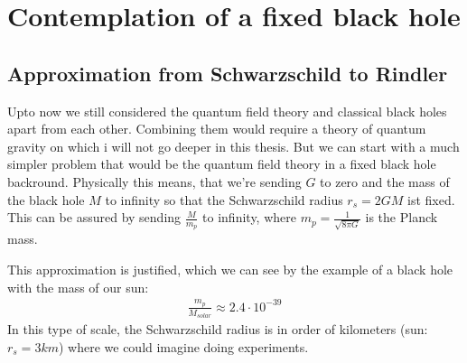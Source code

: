 \section{Contemplation of a fixed black hole}

\subsection{Approximation from Schwarzschild to Rindler \checkmark} \label{approxChap}
Upto now we still considered the quantum field theory and classical black holes apart from each other. Combining them would require a theory of quantum gravity on which i will not go deeper in this thesis. But we can start with a much simpler problem that would be the quantum field theory in a fixed black hole backround. Physically this means, that we're sending $G$ to zero and the mass of the black hole $M$ to infinity so that the Schwarzschild radius $r_s = 2GM$ ist fixed. This can be assured by sending $\frac{M}{m_p}$ to infinity, where $m_p =\frac{1}{\sqrt{8\pi G}}$ is the Planck mass. 

This approximation is justified, which we can see by the example of a black hole with the mass of our sun:
	\begin{align}
		\frac{m_p}{M_{solar}} \approx 2.4 \cdot 10^{-39}
	\end{align}	 
In this type of scale, the Schwarzschild radius is in order of kilometers (sun: $r_s=3 \unit{km}$) where we could imagine doing experiments. 

